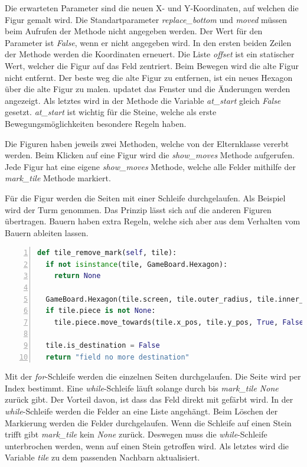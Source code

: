 Die erwarteten Parameter sind die neuen X- und Y-Koordinaten, auf welchen die Figur gemalt wird. Die Standartparameter \textit{replace\_bottom} und \textit{moved} müssen beim Aufrufen der Methode nicht angegeben werden. Der Wert für den Parameter ist \textit{False}, wenn er nicht angegeben wird. In den ersten beiden Zeilen der Methode werden die Koordinaten erneuert. Die Liste \textit{offset} ist ein statischer Wert, welcher die Figur auf das Feld zentriert. Beim Bewegen wird die alte Figur nicht entfernt. Der beste weg die alte Figur zu entfernen, ist ein neues Hexagon über die alte Figur zu malen.  updatet das Fenster und die Änderungen werden angezeigt. Als letztes wird in der Methode die Variable \textit{at\_start} gleich \textit{False} gesetzt. \textit{at\_start} ist wichtig für die Steine, welche als erste Bewegungsmöglichkeiten besondere Regeln haben.\par
Die Figuren haben jeweils zwei Methoden, welche von der Elternklasse vererbt werden. Beim Klicken auf eine Figur wird die \textit{show\_moves} Methode aufgerufen. Jede Figur hat eine eigene \textit{show\_moves} Methode, welche alle Felder mithilfe der \textit{mark\_tile} Methode markiert.\par
Für die Figur werden die Seiten mit einer Schleife durchgelaufen. Als Beispiel wird der Turm genommen. Das Prinzip lässt sich auf die anderen Figuren übertragen. Bauern haben extra Regeln, welche sich aber aus dem Verhalten vom Bauern ableiten lassen.

\begin{lstlisting}[language=python,caption={Figur zeige Bewegungsmöglichkeiten},captionpos=b,label={lst:hexa:show},numbers=left,frame=none,escapechar=|]
def tile_remove_mark(self, tile):
  if not isinstance(tile, GameBoard.Hexagon):
    return None

  GameBoard.Hexagon(tile.screen, tile.outer_radius, tile.inner_radius,tile.x_pos, tile.y_pos)|\label{r:line5}|
  if tile.piece is not None:
    tile.piece.move_towards(tile.x_pos, tile.y_pos, True, False)

  tile.is_destination = False
  return "field no more destination"
\end{lstlisting}

Mit der \textit{for}-Schleife werden die einzelnen Seiten durchgelaufen. Die Seite wird per Index bestimmt. Eine \textit{while}-Schleife läuft solange durch bis \textit{mark\_tile None} zurück gibt. Der Vorteil davon, ist dass das Feld direkt mit gefärbt wird. In der \textit{while}-Schleife werden die Felder an eine Liste angehängt. Beim Löschen der Markierung werden die Felder durchgelaufen. Wenn die Schleife auf einen Stein trifft gibt \textit{mark\_tile} kein \textit{None} zurück. Deswegen muss die \textit{while}-Schleife unterbrochen werden, wenn auf einen Stein getroffen wird. Als letztes wird die Variable \textit{tile} zu dem passenden Nachbarn aktualisiert.
